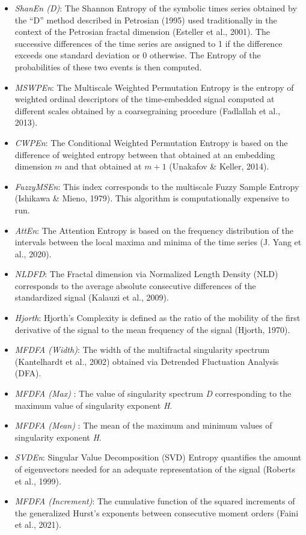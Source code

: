 \documentclass[
  man]{apa6}
\providecommand{\tightlist}{%
  \setlength{\itemsep}{0pt}\setlength{\parskip}{0pt}}
\begin{document}
\begin{itemize}
\tightlist
\item
  \emph{ShanEn (D)}: The Shannon Entropy of the symbolic times series obtained by the ``D'' method described in Petrosian (1995) used traditionally in the context of the Petrosian fractal dimension (Esteller et al., 2001). The successive differences of the time series are assigned to 1 if the difference exceeds one standard deviation or 0 otherwise. The Entropy of the probabilities of these two events is then computed.
\item
  \emph{MSWPEn}: The Multiscale Weighted Permutation Entropy is the entropy of weighted ordinal descriptors of the time-embedded signal computed at different scales obtained by a coarsegraining procedure (Fadlallah et al., 2013).
\item
  \emph{CWPEn}: The Conditional Weighted Permutation Entropy is based on the difference of weighted entropy between that obtained at an embedding dimension \(m\) and that obtained at \(m+1\) (Unakafov \& Keller, 2014).
\item
  \emph{FuzzyMSEn}: This index corresponds to the multiscale Fuzzy Sample Entropy (Ishikawa \& Mieno, 1979). This algorithm is computationally expensive to run.
\item
  \emph{AttEn}: The Attention Entropy is based on the frequency distribution of the intervals between the local maxima and minima of the time series (J. Yang et al., 2020).
\item
  \emph{NLDFD}: The Fractal dimension via Normalized Length Density (NLD) corresponds to the average absolute consecutive differences of the standardized signal (Kalauzi et al., 2009).
\item
  \emph{Hjorth}: Hjorth's Complexity is defined as the ratio of the mobility of the first derivative of the signal to the mean frequency of the signal (Hjorth, 1970).
\item
  \emph{MFDFA (Width)}: The width of the multifractal singularity spectrum (Kantelhardt et al., 2002) obtained via Detrended Fluctuation Analysis (DFA).
\item
  \emph{MFDFA (Max)} : The value of singularity spectrum \emph{D} corresponding to the maximum value of singularity exponent \emph{H}.
\item
  \emph{MFDFA (Mean)} : The mean of the maximum and minimum values of singularity exponent \emph{H}.
\item
  \emph{SVDEn}: Singular Value Decomposition (SVD) Entropy quantifies the amount of eigenvectors needed for an adequate representation of the signal (Roberts et al., 1999).
\item
  \emph{MFDFA (Increment)}: The cumulative function of the squared increments of the generalized Hurst's exponents between consecutive moment orders (Faini et al., 2021).
\end{itemize}
\end{document}
